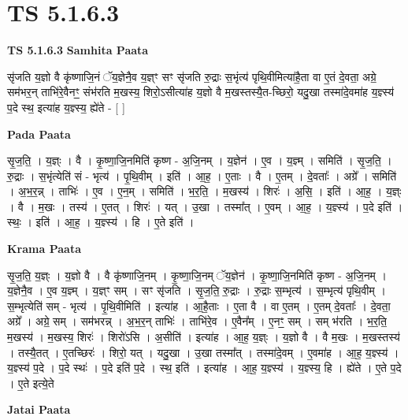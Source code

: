 \documentclass[17pt]{extarticle}
\begin{document}
\section{ TS 5.1.6.3 }

\textbf{TS 5.1.6.3 } \newline
\textbf{Samhita Paata} \newline

सृ॑जति य॒ज्ञो वै कृ॑ष्णाजि॒नं ॅय॒ज्ञेनै॒व य॒ज्ञ्ꣳ सꣳ सृ॑जति रु॒द्राः स॒भृंत्य॑ पृथि॒वीमित्या॑है॒ता वा ए॒तं दे॒वता॒ अग्रे॒ सम॑भर॒न् ताभि॑रे॒वैनꣳ॒॒ संभ॑रति म॒खस्य॒ शिरो॒ऽसीत्या॑ह य॒ज्ञो वै म॒खस्तस्यै॒त-च्छिरो॒ यदु॒खा तस्मा॑दे॒वमा॑ह य॒ज्ञ्स्य॑ प॒दे स्थ॒ इत्या॑ह य॒ज्ञ्स्य॒ ह्ये॑ते - [  ] \newline

\textbf{Pada Paata} \newline

सृ॒ज॒ति॒ । य॒ज्ञ्ः । वै । कृ॒ष्णा॒जि॒नमिति॑ कृष्ण - अ॒जि॒नम् । य॒ज्ञेन॑ । ए॒व । य॒ज्ञ्म् । समिति॑ । सृ॒ज॒ति॒ । रु॒द्राः । स॒भृंत्येति॑ सं - भृत्य॑ । पृ॒थि॒वीम् । इति॑ । आ॒ह॒ । ए॒ताः । वै । ए॒तम् । दे॒वताः᳚ । अग्रे᳚ । समिति॑ । अ॒भ॒र॒न्न् । ताभिः॑ । ए॒व । ए॒न॒म् । समिति॑ । भ॒र॒ति॒ । म॒खस्य॑ । शिरः॑ । अ॒सि॒ । इति॑ । आ॒ह॒ । य॒ज्ञ्ः । वै । म॒खः । तस्य॑ । ए॒तत् । शिरः॑ । यत् । उ॒खा । तस्मा᳚त् । ए॒वम् । आ॒ह॒ । य॒ज्ञ्स्य॑ । प॒दे इति॑ । स्थः॒ । इति॑ । आ॒ह॒ । य॒ज्ञ्स्य॑ । हि । ए॒ते इति॑ ।  \newline


\textbf{Krama Paata} \newline

सृ॒ज॒ति॒ य॒ज्ञ्ः । य॒ज्ञो वै । वै कृ॑ष्णाजि॒नम् । कृ॒ष्णा॒जि॒नम् ॅय॒ज्ञेन॑ । कृ॒ष्णा॒जि॒नमिति॑ कृष्ण - अ॒जि॒नम् । य॒ज्ञेनै॒व । ए॒व य॒ज्ञ्म् । य॒ज्ञ्ꣳ सम् । सꣳ सृ॑जति । सृ॒ज॒ति॒ रु॒द्राः । रु॒द्राः स॒म्भृत्य॑ । स॒म्भृत्य॑ पृथि॒वीम् । स॒म्भृत्येति॑ सम् - भृत्य॑ । पृ॒थि॒वीमिति॑ । इत्या॑ह । आ॒है॒ताः । ए॒ता वै । वा ए॒तम् । ए॒तम् दे॒वताः᳚ । दे॒वता॒ अग्रे᳚ । अग्रे॒ सम् । सम॑भरन्न् । अ॒भ॒र॒न् ताभिः॑ । ताभि॑रे॒व । ए॒वैन᳚म् । ए॒नꣳ॒॒ सम् । सम् भ॑रति । भ॒र॒ति॒ म॒खस्य॑ । म॒खस्य॒ शिरः॑ । शिरो॑ऽसि । अ॒सीति॑ । इत्या॑ह । आ॒ह॒ य॒ज्ञ्ः । य॒ज्ञो वै । वै म॒खः । म॒खस्तस्य॑ । तस्यै॒तत् । ए॒तच्छिरः॑ । शिरो॒ यत् । यदु॒खा । उ॒खा तस्मा᳚त् । तस्मा॑दे॒वम् । ए॒वमा॑ह । आ॒ह॒ य॒ज्ञ्स्य॑ । य॒ज्ञ्स्य॑ प॒दे । प॒दे स्थः॑ । प॒दे इति॑ प॒दे । स्थ॒ इति॑ । इत्या॑ह । आ॒ह॒ य॒ज्ञ्स्य॑ । य॒ज्ञ्स्य॒ हि । ह्ये॑ते । ए॒ते प॒दे । ए॒ते इत्ये॒ते \newline

\textbf{Jatai Paata} \newline
\end{document}
